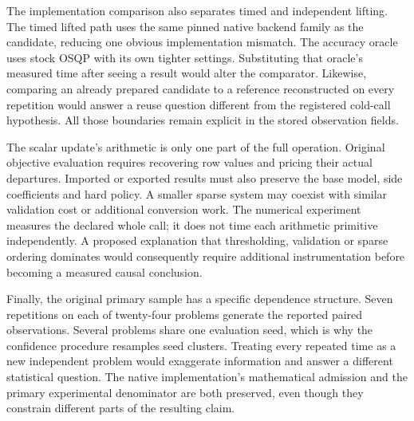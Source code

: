 The implementation comparison also separates timed and independent
lifting. The timed lifted path uses the same pinned native backend
family as the candidate, reducing one obvious implementation mismatch.
The accuracy oracle uses stock OSQP with its own tighter settings.
Substituting that oracle's measured time after seeing a result would
alter the comparator. Likewise, comparing an already prepared candidate
to a reference reconstructed on every repetition would answer a reuse
question different from the registered cold-call hypothesis. All those
boundaries remain explicit in the stored observation fields.

The scalar update's arithmetic is only one part of the full operation.
Original objective evaluation requires recovering row values and pricing
their actual departures. Imported or exported results must also preserve
the base model, side coefficients and hard policy. A smaller sparse
system may coexist with similar validation cost or additional conversion
work. The numerical experiment measures the declared whole call; it
does not time each arithmetic primitive independently. A proposed
explanation that thresholding, validation or sparse ordering dominates
would consequently require additional instrumentation before becoming
a measured causal conclusion.

Finally, the original primary sample has a specific dependence structure.
Seven repetitions on each of twenty-four problems generate the reported
paired observations. Several problems share one evaluation seed, which
is why the confidence procedure resamples seed clusters. Treating every
repeated time as a new independent problem would exaggerate information
and answer a different statistical question. The native implementation's
mathematical admission and the primary experimental denominator are both
preserved, even though they constrain different parts of the resulting
claim.
